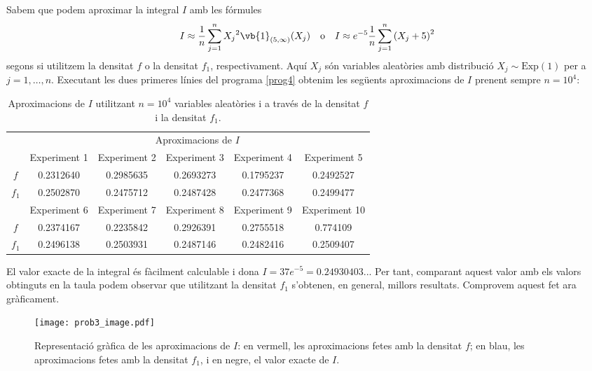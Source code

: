 \documentclass[11pt,a4paper]{article}
\begin{document}
Sabem que podem aproximar la integral $I$ amb les fórmules
$$I\approx \frac{1}{n}\sum_{j=1}^n{X_j}^2\vb{1}_{(5,\infty)}(X_j)\quad\text{o}\quad I\approx e^{-5}\frac{1}{n}\sum_{j=1}^n{(X_j+5)}^2$$
segons si utilitzem la densitat $f$ o la densitat $f_1$, respectivament. Aquí $X_j$ són variables aleatòries amb distribució $X_j\sim\text{Exp}(1)$ per a $j=1,\ldots,n$. Executant les dues primeres línies del programa \ref{prog4} obtenim les següents aproximacions de $I$ prenent sempre $n=10^4$:
\begin{table}[ht]
  \centering
  \begin{tabular}{|c|c|c|c|c|c|}
    \hline
          & \multicolumn{5}{c|}{Aproximacions de $I$}                                                              \\
    \cline{2-6}
          & Experiment 1                              & Experiment 2 & Experiment 3 & Experiment 4 & Experiment 5  \\
    \hline
    $f$   & 0.2312640                                 & 0.2985635    & 0.2693273    & 0.1795237    & 0.2492527     \\
    \hline
    $f_1$ & 0.2502870                                 & 0.2475712    & 0.2487428    & 0.2477368    & 0.2499477     \\
    \hline
    \hline
          & Experiment 6                              & Experiment 7 & Experiment 8 & Experiment 9 & Experiment 10 \\
    \hline
    $f$   & 0.2374167                                 & 0.2235842    & 0.2926391    & 0.2755518    & 0.774109      \\
    \hline
    $f_1$ & 0.2496138                                 & 0.2503931    & 0.2487146    & 0.2482416    & 0.2509407     \\
    \hline
  \end{tabular}
  \caption{Aproximacions de $I$ utilitzant $n=10^4$ variables aleatòries i a través de la densitat $f$ i la densitat $f_1$.}
\end{table}

El valor exacte de la integral és fàcilment calculable i dona $I=37e^{-5}=0.24930403...$ Per tant, comparant aquest valor amb els valors obtinguts en la taula podem observar que utilitzant la densitat $f_1$ s'obtenen, en general, millors resultats. Comprovem aquest fet ara gràficament.
\newpage
\begin{figure}
  \centering
  \texttt{[image: prob3\_image.pdf]}
  \caption{Representació gràfica de les aproximacions de $I$: en vermell, les aproximacions fetes amb la densitat $f$; en blau, les aproximacions fetes amb la densitat $f_1$, i en negre, el valor exacte de $I$.}
  \label{graf1}
\end{figure}
\end{document}
